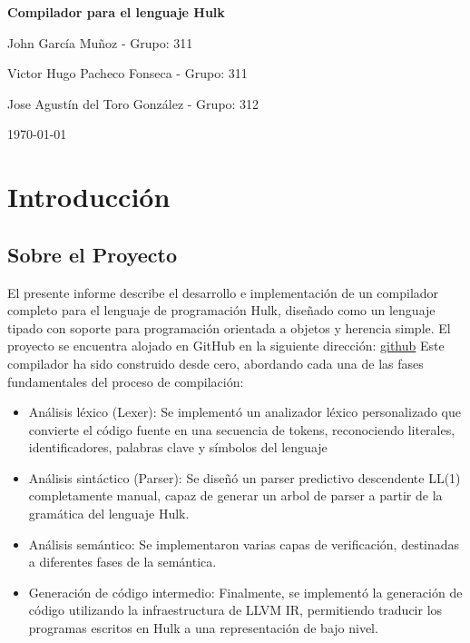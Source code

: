 \documentclass[a4paper,12pt]{article}
\begin{document}
\begin{titlepage}
    \centering
    \vspace{1in}
    {\Huge \bfseries Compilador para el lenguaje Hulk \par}
    \vspace{1.5in}
    {\Large John García Muñoz - Grupo: 311  \par}
    {\Large Victor Hugo Pacheco Fonseca - Grupo: 311 \par}
    {\Large Jose Agustín del Toro González - Grupo: 312 \par}
    \vfill
    {\Large \today \par}
\end{titlepage}

\tableofcontents
\newpage

\section{Introducción}

\subsection{Sobre el Proyecto}
El presente informe describe el desarrollo e implementación de un compilador completo para el lenguaje de programación Hulk, diseñado como un lenguaje tipado con soporte para programación orientada a objetos y herencia simple. El proyecto se encuentra alojado en GitHub en la siguiente dirección:   \href{https://github.com/Victor003h/Hulk_project.git}{github}
\newline
Este compilador ha sido construido desde cero, abordando cada una de las fases fundamentales del proceso de compilación:

\begin{itemize}
	\item Análisis léxico (Lexer): Se implementó un analizador léxico personalizado que convierte el código fuente en una secuencia de tokens, reconociendo literales, identificadores, palabras clave y símbolos del lenguaje
	
	\item Análisis sintáctico (Parser): Se diseñó un parser predictivo descendente LL(1) completamente manual, capaz de generar un arbol de parser a partir de la gramática del lenguaje Hulk.
	\item Análisis semántico: Se implementaron varias capas de verificación, destinadas a diferentes fases de la semántica.
	\item Generación de código intermedio: Finalmente, se implementó la generación de código utilizando la infraestructura de LLVM IR, permitiendo traducir los programas escritos en Hulk a una representación de bajo nivel.
\end{itemize}
\end{document}

